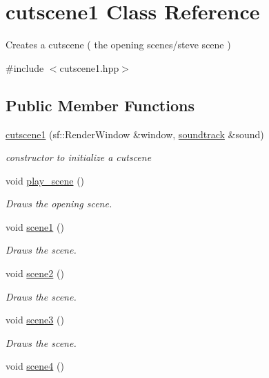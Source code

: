 \hypertarget{classcutscene1}{}\section{cutscene1 Class Reference}
\label{classcutscene1}


Creates a cutscene ( the opening scenes/steve scene )  




{\ttfamily \#include $<$cutscene1.\+hpp$>$}

\subsection*{Public Member Functions}
\begin{DoxyCompactItemize}
\item 
\hyperlink{classcutscene1_acf92c92aba72e1858d7ace167c231ece}{cutscene1} (sf\+::\+Render\+Window \&window, \hyperlink{classsoundtrack}{soundtrack} \&sound)
\begin{DoxyCompactList}\small\item\em constructor to initialize a cutscene \end{DoxyCompactList}\item 
void \hyperlink{classcutscene1_af4c8e7ddc01274a70da482e1d7f56a14}{play\+\_\+scene} ()
\begin{DoxyCompactList}\small\item\em Draws the opening scene. \end{DoxyCompactList}\item 
void \hyperlink{classcutscene1_a169d9eef0707c691dbb2eb94ad07f844}{scene1} ()
\begin{DoxyCompactList}\small\item\em Draws the scene. \end{DoxyCompactList}\item 
void \hyperlink{classcutscene1_a8ccf64a236d3ddc02d9fe3c1c612495e}{scene2} ()
\begin{DoxyCompactList}\small\item\em Draws the scene. \end{DoxyCompactList}\item 
void \hyperlink{classcutscene1_a1d3f3933b12bc06b7384bb0f81b00bc0}{scene3} ()
\begin{DoxyCompactList}\small\item\em Draws the scene. \end{DoxyCompactList}\item 
void \hyperlink{classcutscene1_abbb516e182b20fe773d09419349ecbfe}{scene4} ()

\end{DoxyCompactItemize}

